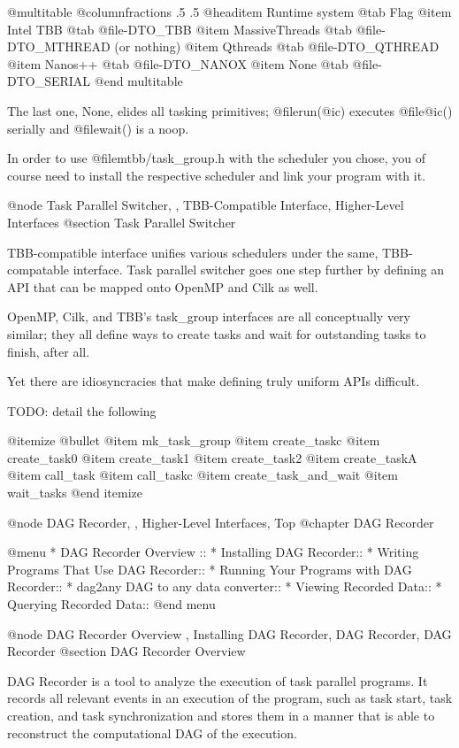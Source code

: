 @multitable @columnfractions .5 .5
@headitem Runtime system @tab Flag 
@item Intel TBB      @tab @file{-DTO_TBB}
@item MassiveThreads @tab @file{-DTO_MTHREAD} (or nothing)
@item Qthreads       @tab @file{-DTO_QTHREAD}
@item Nanos++        @tab @file{-DTO_NANOX}
@item None           @tab @file{-DTO_SERIAL}
@end multitable

The last one, None, elides all tasking primitives; @file{run(@i{c})} executes @file{@i{c}()} serially and @file{wait()} is a noop.  

In order to use @file{mtbb/task_group.h} with the scheduler you chose, you of course need to install the respective scheduler and link your program with it.  

@node Task Parallel Switcher,  , TBB-Compatible Interface, Higher-Level Interfaces
@section  Task Parallel Switcher

TBB-compatible interface unifies various schedulers under the same,
TBB-compatable interface.  Task parallel switcher goes one step further 
by defining an API that can be mapped onto OpenMP and Cilk as well.

OpenMP, Cilk, and TBB's task_group interfaces are all conceptually very
similar; they all define ways to create tasks and wait for outstanding
tasks to finish, after all.

Yet there are idiosyncracies that make defining truly uniform APIs
difficult.  

TODO: detail the following

@itemize @bullet
@item mk_task_group
@item create_taskc
@item create_task0
@item create_task1
@item create_task2
@item create_taskA
@item call_task
@item call_taskc
@item create_task_and_wait
@item wait_tasks
@end itemize

@node DAG Recorder,  , Higher-Level Interfaces, Top
@chapter DAG Recorder

@menu
* DAG Recorder Overview ::
* Installing DAG Recorder::
* Writing Programs That Use DAG Recorder::
* Running Your Programs with DAG Recorder::
* dag2any DAG to any data converter::
* Viewing Recorded Data::
* Querying Recorded Data::
@end menu

@node DAG Recorder Overview , Installing DAG Recorder, DAG Recorder, DAG Recorder
@section DAG Recorder Overview 

DAG Recorder is a tool to analyze the execution of task parallel
programs.  It records all relevant events in an execution of the
program, such as task start, task creation, and task synchronization and
stores them in a manner that is able to reconstruct the computational
DAG of the execution.

